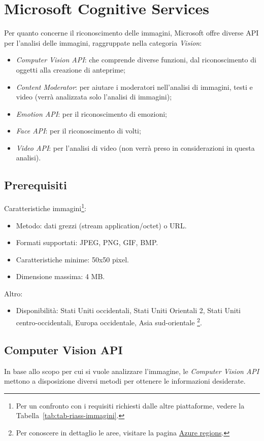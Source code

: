 
\section{Microsoft Cognitive Services}
Per quanto concerne il riconoscimento delle immagini, Microsoft offre diverse API per l'analisi delle immagini, raggruppate nella categoria \textit{Vision}:
\begin{itemize}
\item \textit{Computer Vision API}: che comprende diverse funzioni, dal riconoscimento di oggetti alla creazione di anteprime;
\item \textit{Content Moderator}: per aiutare i moderatori nell'analisi di immagini, testi e video (verrà analizzata solo l'analisi di immagini);
\item \textit{Emotion API}: per il riconoscimento di emozioni;
\item \textit{Face API}: per il riconoscimento di volti;
\item \textit{Video API}: per l'analisi di video (non verrà preso in considerazioni in questa analisi).
\end{itemize}
%
\subsection{Prerequisiti}
Caratteristiche immagini\footnote{Per un confronto con i requisiti richiesti dalle altre piattaforme,
vedere la Tabella~\ref{tab:tab-riass-immagini}.}:
\begin{itemize}
\item Metodo: dati grezzi (stream application/octet) o URL.
\item Formati supportati: JPEG, PNG, GIF, BMP.
\item Caratteristiche minime: 50x50 pixel.
\item Dimensione massima: 4 MB.
\end{itemize}
Altro:
\begin{itemize}
\item Disponibilità: Stati Uniti occidentali, Stati Uniti Orientali 2, Stati Uniti centro-occidentali, Europa occidentale, Asia sud-orientale
\footnote{Per conoscere in dettaglio le aree, visitare la pagina \href{https://azure.microsoft.com/en-us/regions/}{Azure regions}.}.
\end{itemize}
%
\subsection{Computer Vision API}\label{subsec:computer-vision-api}
In base allo scopo per cui si vuole analizzare l'immagine, le \textit{Computer Vision API} \cite{microsoft-api} mettono a disposizione diversi metodi per ottenere le informazioni desiderate.

